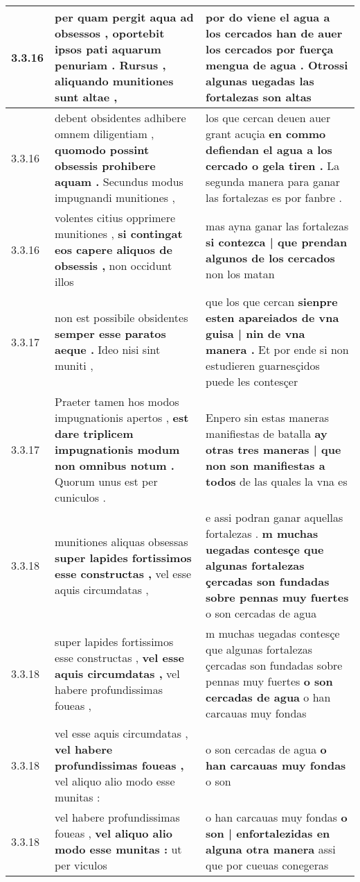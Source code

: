\begin{tabular}{|p{1cm}|p{6.5cm}|p{6.5cm}|}
3.3.16 & per quam pergit aqua ad obsessos , \textbf{ oportebit ipsos pati aquarum penuriam . } Rursus , aliquando munitiones sunt altae , & por do viene el agua a los cercados han de auer los cercados \textbf{ por fuerça mengua de agua . } Otrossi algunas uegadas las fortalezas son altas \\\hline
3.3.16 & debent obsidentes adhibere omnem diligentiam , \textbf{ quomodo possint obsessis prohibere aquam . } Secundus modus impugnandi munitiones , & los que cercan deuen auer grant acuçia \textbf{ en commo defiendan el agua a los cercado o gela tiren . } La segunda manera para ganar las fortalezas es por fanbre . \\\hline
3.3.16 & volentes citius opprimere munitiones , \textbf{ si contingat eos capere aliquos de obsessis , } non occidunt illos & mas ayna ganar las fortalezas \textbf{ si contezca | que prendan algunos de los cercados } non los matan \\\hline
3.3.17 & non est possibile obsidentes \textbf{ semper esse paratos aeque . } Ideo nisi sint muniti , & que los que cercan \textbf{ sienpre esten apareiados de vna guisa | nin de vna manera . } Et por ende si non estudieren guarnesçidos puede les contesçer \\\hline
3.3.17 & Praeter tamen hos modos impugnationis apertos , \textbf{ est dare triplicem impugnationis modum non omnibus notum . } Quorum unus est per cuniculos . & Enpero sin estas maneras manifiestas de batalla \textbf{ ay otras tres maneras | que non son manifiestas a todos } de las quales la vna es \\\hline
3.3.18 & munitiones aliquas obsessas \textbf{ super lapides fortissimos esse constructas , } vel esse aquis circumdatas , & e assi podran ganar aquellas fortalezas . \textbf{ m muchas uegadas contesçe que algunas fortalezas çercadas son fundadas sobre pennas muy fuertes } o son cercadas de agua \\\hline
3.3.18 & super lapides fortissimos esse constructas , \textbf{ vel esse aquis circumdatas , } vel habere profundissimas foueas , & m muchas uegadas contesçe que algunas fortalezas çercadas son fundadas sobre pennas muy fuertes \textbf{ o son cercadas de agua } o han carcauas muy fondas \\\hline
3.3.18 & vel esse aquis circumdatas , \textbf{ vel habere profundissimas foueas , } vel aliquo alio modo esse munitas : & o son cercadas de agua \textbf{ o han carcauas muy fondas } o son \\\hline
3.3.18 & vel habere profundissimas foueas , \textbf{ vel aliquo alio modo esse munitas : } ut per viculos & o han carcauas muy fondas \textbf{ o son | enfortalezidas en alguna otra manera } assi que por cueuas conegeras \\\hline

\end{tabular}
